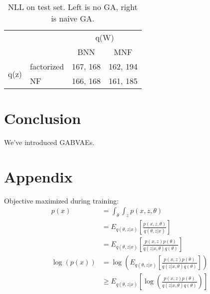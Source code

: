 \documentclass{article}
\begin{document}
\begin{table}[h]
\centering
\label{table_ga}
\begin{tabular}{llcc}
                                           &            & \multicolumn{2}{c}{q(W)} \\ \cline{3-4} 
                                           &            & BNN         & MNF        \\
\multicolumn{1}{c|}{\multirow{2}{*}{q(z)}} & factorized & 167, 168    & 162, 194    \\
\multicolumn{1}{c|}{}                      & NF         & 166, 168     & 161, 185   
\end{tabular}
\caption{NLL on test set. Left is no GA, right is naive GA. }
\end{table}

\section{Conclusion}

We've introduced GABVAEs.






\newpage 

\section{Appendix}

Objective maximized during training:
\begin{align}
    p(x) &= \int_{\theta} \int_{z} p(x,z,\theta) \\
    &= E_{q(\theta,z|x)} \left[ \frac{p(x,z,\theta)}{q(\theta,z|x)} \right ] \\
    &= E_{q(\theta,z|x)} \left[ \frac{p(x,z)p(\theta)}{q(z|x,\theta)q(\theta)} \right ] \\
   \log(p(x)) &=\log \left( E_{q(\theta,z|x)} \left[ \frac{p(x,z)p(\theta)}{q(z|x,\theta)q(\theta)} \right ] \right) \\
    &\geq  E_{q(\theta,z|x)} \left[\log \left( \frac{p(x,z)p(\theta)}{q(z|x,\theta)q(\theta)} \right) \right ] 
\end{align}
\end{document}
